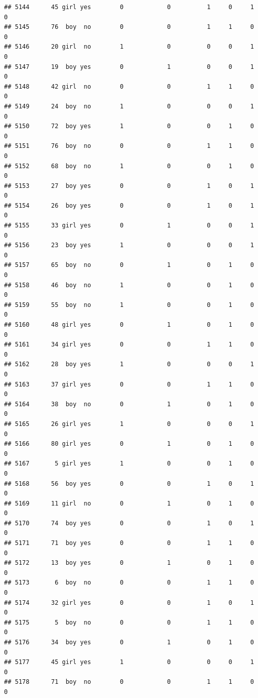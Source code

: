 \documentclass[man]{apa6}
\begin{document}
\begin{verbatim}
## 5144      45 girl yes        0            0          1     0     1     0
## 5145      76  boy  no        0            0          1     1     0     0
## 5146      20 girl  no        1            0          0     0     1     0
## 5147      19  boy yes        0            1          0     0     1     0
## 5148      42 girl  no        0            0          1     1     0     0
## 5149      24  boy  no        1            0          0     0     1     0
## 5150      72  boy yes        1            0          0     1     0     0
## 5151      76  boy  no        0            0          1     1     0     0
## 5152      68  boy  no        1            0          0     1     0     0
## 5153      27  boy yes        0            0          1     0     1     0
## 5154      26  boy yes        0            0          1     0     1     0
## 5155      33 girl yes        0            1          0     0     1     0
## 5156      23  boy yes        1            0          0     0     1     0
## 5157      65  boy  no        0            1          0     1     0     0
## 5158      46  boy  no        1            0          0     1     0     0
## 5159      55  boy  no        1            0          0     1     0     0
## 5160      48 girl yes        0            1          0     1     0     0
## 5161      34 girl yes        0            0          1     1     0     0
## 5162      28  boy yes        1            0          0     0     1     0
## 5163      37 girl yes        0            0          1     1     0     0
## 5164      38  boy  no        0            1          0     1     0     0
## 5165      26 girl yes        1            0          0     0     1     0
## 5166      80 girl yes        0            1          0     1     0     0
## 5167       5 girl yes        1            0          0     1     0     0
## 5168      56  boy yes        0            0          1     0     1     0
## 5169      11 girl  no        0            1          0     1     0     0
## 5170      74  boy yes        0            0          1     0     1     0
## 5171      71  boy yes        0            0          1     1     0     0
## 5172      13  boy yes        0            1          0     1     0     0
## 5173       6  boy  no        0            0          1     1     0     0
## 5174      32 girl yes        0            0          1     0     1     0
## 5175       5  boy  no        0            0          1     1     0     0
## 5176      34  boy yes        0            1          0     1     0     0
## 5177      45 girl yes        1            0          0     0     1     0
## 5178      71  boy  no        0            0          1     1     0     0

\end{verbatim}
\end{document}
